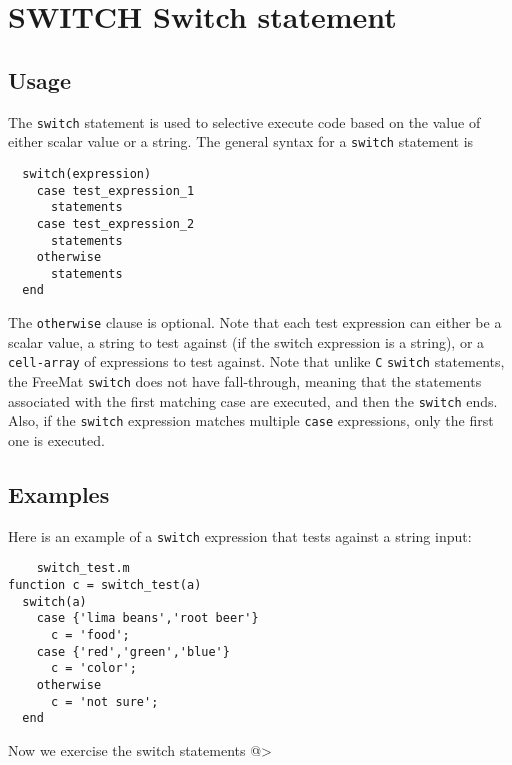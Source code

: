 \section{SWITCH Switch statement}

\subsection{Usage}

The \verb|switch| statement is used to selective execute code
based on the value of either scalar value or a string.
The general syntax for a \verb|switch| statement is
\begin{verbatim}
  switch(expression)
    case test_expression_1
      statements
    case test_expression_2
      statements
    otherwise
      statements
  end
\end{verbatim}
The \verb|otherwise| clause is optional.  Note that each test
expression can either be a scalar value, a string to test
against (if the switch expression is a string), or a 
\verb|cell-array| of expressions to test against.  Note that
unlike \verb|C| \verb|switch| statements, the FreeMat \verb|switch|
does not have fall-through, meaning that the statements
associated with the first matching case are executed, and
then the \verb|switch| ends.  Also, if the \verb|switch| expression
matches multiple \verb|case| expressions, only the first one
is executed.
\subsection{Examples}

Here is an example of a \verb|switch| expression that tests
against a string input:
\begin{verbatim}
    switch_test.m
function c = switch_test(a)
  switch(a)
    case {'lima beans','root beer'}
      c = 'food';
    case {'red','green','blue'}
      c = 'color';
    otherwise
      c = 'not sure';
  end
\end{verbatim}
Now we exercise the switch statements
@>
